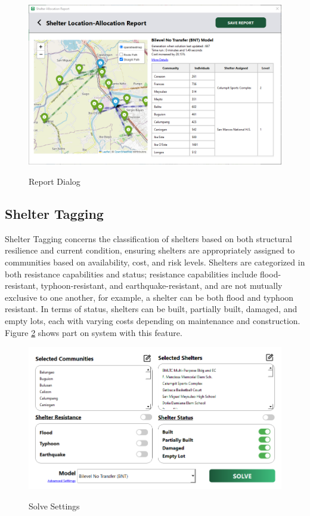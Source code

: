 \documentclass[12pt,a4paper,]{article}
\begin{document}
	\begin{figure}[h!]
		\caption{Report Dialog}
		\centering
		\includegraphics[width=\columnwidth]{Chapter 4/alloc report}
		\label{shelAllocRep}
	\end{figure}
	
	\subsection{Shelter Tagging}
	Shelter Tagging concerns the classification of shelters based on both structural resilience and current condition, ensuring shelters are appropriately assigned to communities based on availability, cost, and risk levels. Shelters are categorized in both resistance capabilities and status; resistance capabilities include flood-resistant, typhoon-resistant, and earthquake-resistant, and are not mutually exclusive to one another, for example, a shelter can be both flood and typhoon resistant. In terms of status, shelters can be built, partially built, damaged, and empty lots, each with varying costs depending on maintenance and construction. Figure \ref{solveSet} shows part on system with this feature.
	
	\begin{figure}[h!]
		\caption{Solve Settings}
		\centering
		\includegraphics[width=\columnwidth]{Chapter 4/solvesettings}
		\label{solveSet}
	\end{figure}
	
\end{document}
